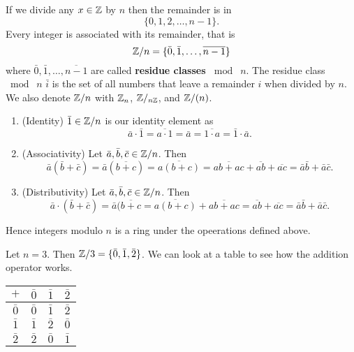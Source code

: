 \begin{example}
    If we divide any $x \in \mathbb{Z}$ by $n$ then the remainder is in \[ \{ 0, 1, 2, \ldots, n-1 \}. \] Every integer is associated with its remainder, that is \[ \mathbb{Z}/n = \{ \bar 0, \bar 1, \ldots, \overline{n - 1} \} \] where $\bar 0, \bar 1, \ldots, \overline{n - 1}$ are called \textbf{residue classes $\bmod \; n$}. The residue class $\bmod \; n$ $\bar i$ is the set of all numbers that leave a remainder $i$ when divided by $n$. We also denote $\mathbb{Z}/n$ with $\mathbb{Z}_n$, $\mathbb{Z}/_{n\mathbb{Z}}$, and $\mathbb{Z}/(n)$.
    \begin{enumerate}
        \item (Identity) $\bar 1 \in \mathbb{Z}/n$ is our identity element as \[\bar a \cdot \bar 1 = \overline{a \cdot 1} = \bar a = \overline{1 \cdot a} = \bar 1 \cdot \bar a.\]
        \item (Associativity) Let $\bar a, \bar b, \bar c \in \mathbb{Z}/n$. Then \[ \bar a (\bar b + \bar c) = \bar a (\overline{b + c}) = \overline{a(b + c)} = \overline{ab + ac} + \overline{ab} + \overline{ac} = \bar a \bar b + \bar a \bar c. \]
        \item (Distributivity) Let $\bar a, \bar b, \bar c \in \mathbb{Z}/n$. Then \[ \bar a \cdot (\bar b + \bar c) = \bar a(\overline{b + c}  = \overline{a(b + c)} + \overline{ab + ac} = \overline{ab} + \overline{ac} = \bar a \bar b + \bar a \bar c. \]
    \end{enumerate}
    Hence integers modulo $n$ is a ring under the opeerations defined above.
\end{example}

\begin{example}
    Let $n = 3$. Then $\mathbb{Z}/3 = \{ \bar 0, \bar 1, \bar 2 \}$. We can look at a table to see how the addition operator works.
    \begin{center}
        \begin{tabular}{cccc}
            \toprule
            $+$ & $\bar 0$ & $\bar 1$ & $\bar 2$ \\
            \midrule
            $\bar 0$ & $\bar 0$ & $\bar 1$ & $\bar 2$ \\
            $\bar 1$ & $\bar 1$ & $\bar 2$ & $\bar 0$ \\
            $\bar 2$ & $\bar 2$ & $\bar 0$ & $\bar 1$ \\
            \bottomrule
        \end{tabular}
    \end{center}
\end{example}
